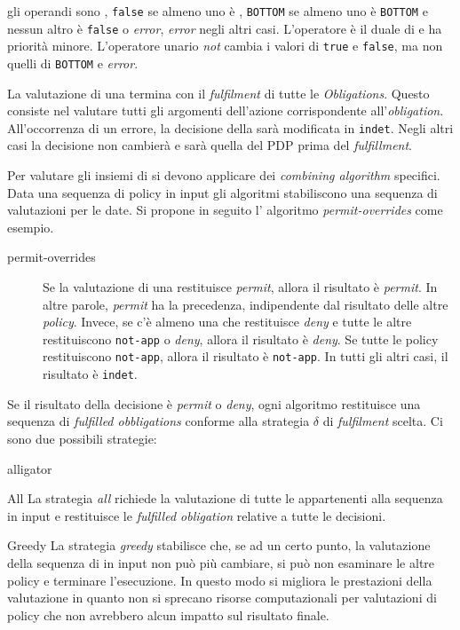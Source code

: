 gli operandi sono \etrue, \texttt{false} se almeno uno è \efalse, \texttt{BOTTOM} se almeno uno è \texttt{BOTTOM} e nessun altro è
\texttt{false} o \emph{error}, \emph{error} negli altri casi. L'operatore \eor è il duale di \eand e ha priorità minore.
L'operatore unario \emph{not} cambia i valori di \texttt{true} e \texttt{false}, ma non quelli di \texttt{BOTTOM} e \emph{error}.\par
La valutazione di una \epolicy termina con il \emph{fulfilment} di tutte le \emph{Obligations}. Questo consiste nel valutare
tutti gli argomenti dell'azione corrispondente all'\emph{obligation}. All'occorrenza di un errore, la decisione della \epolicy
sarà modificata in \texttt{indet}.
Negli altri casi la decisione non cambierà e sarà quella del PDP prima del \emph{fulfillment}.\par
Per valutare gli insiemi di \epolicy si devono applicare dei \emph{combining algorithm} specifici. Data una sequenza di
policy in input gli algoritmi stabiliscono una sequenza di valutazioni per le \epolicy date. Si propone in seguito l' algoritmo
\emph{permit-overrides} come esempio.
\begin{description}
\item[permit-overrides]Se la valutazione di una \epolicy restituisce \emph{permit}, allora il risultato è \emph{permit}.
                        In altre parole, \emph{permit} ha la precedenza, indipendente dal risultato delle altre \emph{policy}.
                        Invece, se c'è almeno una \epolicy che restituisce \emph{deny} e tutte le altre restituiscono
                        \texttt{not-app} o \emph{deny}, allora il risultato è \emph{deny}. Se tutte le policy restituiscono
                        \texttt{not-app}, allora il risultato è \texttt{not-app}. In tutti gli altri casi, il risultato è \texttt{indet}.
\end{description}
Se il risultato della decisione è \emph{permit} o \emph{deny}, ogni algoritmo restituisce una sequenza di \emph{fulfilled obbligations}
conforme alla strategia $\delta$ di \emph{fulfilment} scelta. Ci sono due possibili strategie:
\begin{labeling}{alligator}
  \item[All]La strategia \emph{all} richiede la valutazione di tutte le \epolicy appartenenti alla sequenza in input e
            restituisce le \emph{fulfilled obligation} relative a tutte le decisioni.
  \item[Greedy]La strategia \emph{greedy} stabilisce che, se ad un certo punto, la valutazione della sequenza di \epolicy
               in input non può più cambiare, si può non esaminare le altre policy e terminare l'esecuzione. In questo modo
               si migliora le prestazioni della valutazione in quanto non si sprecano risorse computazionali
               per valutazioni di policy che non avrebbero alcun impatto sul risultato finale.
\end{labeling}\par
